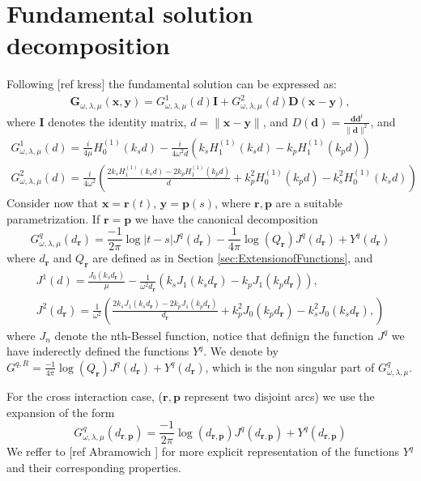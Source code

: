 \documentclass{article}
\newcommand{\todo}[1]{{\color{red}[#1]}}
\newcommand{\bp}{{\bm p}}
\newcommand{\br}{\bm{r}}
\newcommand{\bx}{\bm{x}}
\newcommand{\by}{\bm{y}}
\begin{document}
\section{Fundamental solution decomposition}
\label{ap:kernelsplit}
Following \todo{ref kress} the fundamental solution can be expressed as: 
\begin{align*}
\mathbf{G}_{\omega,\lambda,  \mu}(\mathbf{x},\mathbf{y})  = G^1_{\omega,\lambda, \mu}(d) \mathbf{I} + 
{G}^2_{\omega,\lambda, \mu}(d)\mathbf{D}(\mathbf{x}-\mathbf{y}),
\end{align*}
where $\mathbf{I}$ denotes the identity matrix, $d = \| \mathbf{x} - \mathbf{y}\|$, and $D(\mathbf{d}) = \frac{\mathbf{d} \mathbf{d}^t}{\|\mathbf{d}\|^2}$, and 
\begin{align*}
G^1_{\omega,\lambda, \mu}(d) = \frac{i}{4\mu} H_{0}^{(1)}(k_s d) - \frac{i}{4\omega^2d}(k_s H_1^{(1)}(k_s d)- k_p H_1^{(1)}(k_p d)) \\
G^2_{\omega,\lambda, \mu}(d) = \frac{i}{4\omega^2} \left( 
\frac{2k_s H^{(1)}_1(k_s d)-2k_p H^{(1)}_1(k_p d)}{d}+
k_p^2H^{(1)}_0(k_p d)- k_s^2H^{(1)}_0(k_s d)  
\right)
\end{align*}
Consider now that $\bx = \br(t)$, $\by= \bp(s)$, where $\br,\bp$ are a suitable parametrization. If $\br = \bp$ we have the canonical decomposition 
$$G^q_{\omega,\lambda,\mu}
(d_{\br}) =\frac{-1}{2\pi}\log|t-s| J^q(d_{\br}) - \frac{1}{4\pi}\log (Q_{\br}) J^q(d_{\br})+ Y^q(d_{\br})$$
where $d_{\br}$ and $Q_{\br}$ are defined as in Section \ref{sec:ExtensionofFunctions}, and 
\begin{align*}
J^1(d) = \frac{J_0(k_s d_{\br})}{\mu}- \frac{1}{\omega^2 d_{\br}}(k_sJ_1(k_s d_{\br}) - k_p J_1(k_p d_{\br})), \\
J^2(d_{\br}) = \frac{1}{\omega^2} \left(
\frac{2k_s J_1(k_s d_{\br})-2k_p J_1(k_p d_{\br})}{d_{\br}} +k_p^2J_0(k_p d_{\br}) -k_s^2J_0(k_s d_{\br}),
\right)
\end{align*}
where $J_n$ denote the nth-Bessel function, notice that definign the function $J^q$ we have inderectly defined the functions $Y^q$.  We denote by $G^{q,R} = 
\frac{-1}{4\pi}\log (Q_{\br}) J^q(d_{\br})+ Y^q(d_{\br})$, which is the non singular part of $G_{\omega,\lambda,\mu}^q$.

For the cross interaction case,  ($\br, \bp$ represent two disjoint arcs) we use the expansion of the form 
$$G^q_{\omega,\lambda,\mu}
(d_{\br,\bp}) = \frac{-1}{2\pi}\log (d_{\br,\bp}) J^q(d_{\br,\bp})+ Y^q(d_{\br,\bp})$$
We reffer to \todo{ref Abramowich } for more explicit representation of the functions $Y^q$ and their corresponding properties. 
\end{document}
